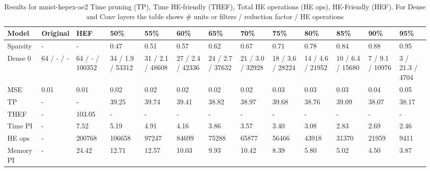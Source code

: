 \begin{table}
\centering
\caption{Results for mnist-hepex-ae2  Time pruning (TP), Time HE-friendly (THEF), Total HE operations (HE ops), HE-Friendly (HEF). For Dense and Conv layers the table shows # units or filters / reduction factor / HE operations}
\label{tab:mnist-hepex-ae2_results}
\begin{tabular}{lllllllllllll}
\toprule
Model &    Original &              HEF &               50\% &               55\% &               60\% &               65\% &               70\% &               75\% &               80\% &               85\% &              90\% &              95\% \\
\midrule
Sparsity  &           - &                - &              0.47 &              0.51 &              0.57 &              0.62 &              0.67 &              0.71 &              0.78 &              0.84 &             0.88 &             0.95 \\
Dense 0   &  64 / - / - &  64 / - / 100352 &  34 / 1.9 / 53312 &  31 / 2.1 / 48608 &  27 / 2.4 / 42336 &  24 / 2.7 / 37632 &  21 / 3.0 / 32928 &  18 / 3.6 / 28224 &  14 / 4.6 / 21952 &  10 / 6.4 / 15680 &  7 / 9.1 / 10976 &  3 / 21.3 / 4704 \\
MSE       &        0.01 &             0.01 &              0.02 &              0.02 &              0.02 &              0.02 &              0.02 &              0.03 &              0.03 &              0.03 &             0.04 &             0.05 \\
TP        &           - &                - &             39.25 &             39.74 &             39.41 &             38.82 &             38.97 &             39.68 &             38.76 &             39.09 &            38.07 &            38.17 \\
THEF      &           - &           103.05 &                 - &                 - &                 - &                 - &                 - &                 - &                 - &                 - &                - &                - \\
Time PI   &           - &             7.52 &              5.19 &              4.91 &              4.16 &              3.86 &              3.57 &              3.40 &              3.08 &              2.83 &             2.69 &             2.46 \\
HE ops    &           - &           200768 &            106658 &             97247 &             84699 &             75288 &             65877 &             56466 &             43918 &             31370 &            21959 &             9411 \\
Memory PI &           - &            24.42 &             12.71 &             12.57 &             10.03 &              9.93 &             10.42 &              8.39 &              5.80 &              5.02 &             4.50 &             3.87 \\
\bottomrule
\end{tabular}
\end{table}
